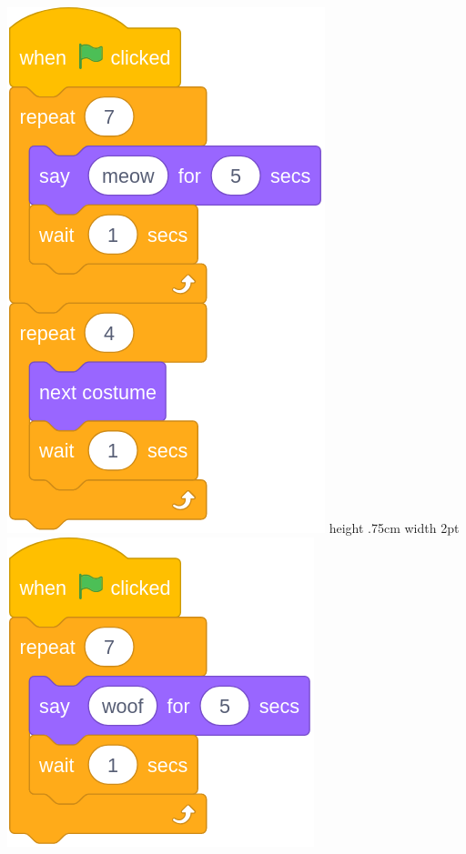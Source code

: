 \documentclass[letterpaper,12pt]{article}
\begin{document}
\includegraphics[scale=.3,valign=t]{q6_script0.png} \hspace{1cm}
 \vline height .75cm width 2pt \hspace{1cm}
\includegraphics[scale=.3, valign=t]{q6_script1.png} \hspace{1cm}
\end{document}
